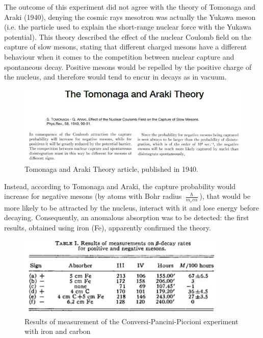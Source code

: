 The outcome of this experiment did not agree with the theory of Tomonaga and Araki (1940), denying the cosmic rays mesotron was actually the Yukawa meson (i.e. the particle used to explain the short-range nuclear force with the Yukawa potential).
This theory described the effect of the nuclear Coulomb field on the capture of slow mesons, stating that different charged mesons have a different behaviour when it comes to the competition between nuclear capture and spontaneous decay. Positive mesons would be repelled by the positive charge of the nucleus, and therefore would tend to encur in decays as in vacuum. %

\begin{figure}[!h]
    \centering
    \includegraphics[width=\textwidth]{Figures/FNSN18_4.JPG}
    \caption{Tomonaga and Araki Theory article, published in 1940.}
    \label{fig:TAT}
\end{figure} 

Instead, according to Tomonaga and Araki, the capture probability would increase for negative mesons (by atoms with Bohr radius $ \frac{\hslash}{m_e c \alpha}$), that would be more likely to be attracted by the nucleus, interact with it and lose energy before decaying. Consequently, an anomalous absorption was to be detected: the first results, obtained using iron (Fe), apparently confirmed the theory. 

\begin{figure}[!h]
    \centering
    \includegraphics[width=0.9\textwidth]{Figures/FNSN18_7.JPG}
    \caption{Results of measurement of the Conversi-Pancini-Piccioni experiment with iron and carbon}
    \label{fig:Data}
\end{figure} 

